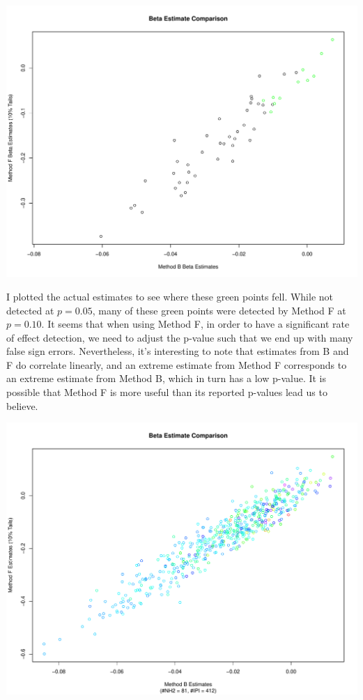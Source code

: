 \documentclass[11pt]{article} %
\begin{document}
\includegraphics[scale=0.5]{BF Comparison Comprehensive.pdf}

I plotted the actual estimates to see where these green points fell. While not detected at $p=0.05$, many of these green points were detected by Method F at $p=0.10$. It seems that when using Method F, in order to have a significant rate of effect detection, we need to adjust the p-value such that we end up with many false sign errors. Nevertheless, it's interesting to note that estimates from B and F do correlate linearly, and an extreme estimate from Method F corresponds to an extreme estimate from Method B, which in turn has a low p-value. It is possible that Method F is more useful than its reported p-values lead us to believe.

\includegraphics[scale=0.5]{ABF Comparison Big.pdf}
\end{document}
